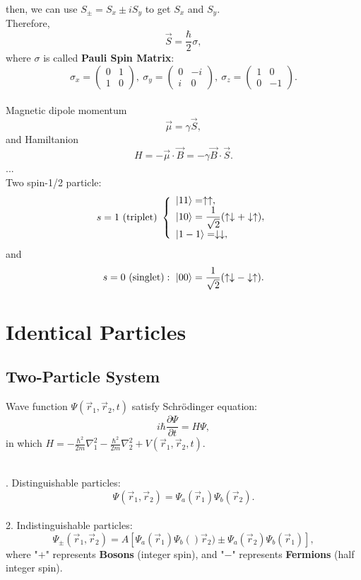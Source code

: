 \documentclass[12pt, 
]{article}
\begin{document}
then, we can use $S_\pm=S_x\pm iS_y$ to get $S_x$ and $S_y$.\\
Therefore, $$\vec{S}=\frac{\hbar}{2}\sigma,$$where $\sigma$ is called {\bf Pauli Spin Matrix}:
\[
	\sigma_x= \begin{pmatrix}
		0&1\\1&0
	\end{pmatrix},~\sigma_y= \begin{pmatrix}
		0&-i\\i&0
	\end{pmatrix},~\sigma_z= \begin{pmatrix}
		1&0\\0&-1
	\end{pmatrix}.
\]
~\\
Magnetic dipole momentum 
\[
	\vec{\mu}=\gamma\vec{S},
\]
and Hamiltanion 
\[
	H=-\vec{\mu}\cdot\vec{B}=-\gamma\vec{B}\cdot\vec{S}.
\]
...\\

\noindent Two spin-1/2 particle:
\[
	s=1~({\rm triplet})~\left\{
	\begin{array}{l}
		\ket{11}=\uparrow\uparrow ,\\
		\ket{10}=\dfrac{1}{\sqrt{2}}(\uparrow\downarrow+\downarrow\uparrow) ,\\
		\ket{1-1}=\downarrow\downarrow,
	\end{array}\right.
\]
and
\[
	s=0~(\rm singlet):~\ket{00}=\frac{1}{\sqrt{2}}(\uparrow\downarrow-\downarrow\uparrow).
\]
\newpage
\section{Identical Particles}
\subsection{Two-Particle System}
Wave function $\varPsi(\vec{r}_1,\vec{r}_2,t)$ satisfy Schr\"odinger equation:
\[
	i\hbar\frac{\partial\varPsi}{\partial t}=H\varPsi,
\]
in which $\displaystyle H=-\frac{\hbar^2}{2m}\nabla^2_1-\frac{\hbar^2}{2m}\nabla_2^2+V(\vec{r}_1,\vec{r}_2,t).$\\~

. Distinguishable particles:
\[
	\varPsi(\vec{r}_1,\vec{r}_2)=\varPsi_a(\vec{r}_1)\varPsi_b(\vec{r}_2).
\]\\
2. Indistinguishable particles:
\[
	\varPsi_\pm(\vec{r}_1,\vec{r}_2)=A[\varPsi_a(\vec{r}_1)\varPsi_b()\vec{r}_2)\pm\varPsi_a(\vec{r}_2)\varPsi_b(\vec{r}_1)],
\]
where "$+$" represents {\bf Bosons} (integer spin), and "$-$" represents {\bf Fermions} (half integer spin).\\
\end{document}
